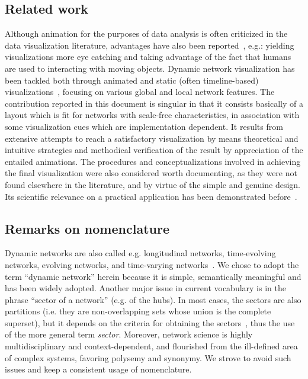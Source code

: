 \documentclass[runningheads]{llncs}
\begin{document}
\subsection{Related work}
Although animation for the purposes of data analysis is often criticized in the data visualization literature, advantages have also been reported~\cite{anim,munzner,cog,ware}, e.g.: yielding visualizations more eye catching and taking advantage of the fact that humans are used to interacting with moving objects.
Dynamic network visualization has been tackled both through animated and static (often timeline-based) visualizations~\cite{hajij,brain,visAn,ego}, focusing on various global and local network features.
The contribution reported in this document is singular in that it consists basically of a layout which is fit for networks with scale-free characteristics, in association with some visualization cues which are implementation dependent. It results from extensive attempts to reach a satisfactory visualization by means theoretical and intuitive strategies and methodical verification of the result by appreciation of the entailed animations.
The procedures and conceptualizations involved in achieving the final visualization were also considered worth documenting, as they were not found elsewhere in the literature, and by virtue of the simple and genuine design. Its scientific relevance on a practical application has been demonstrated before~\cite{stab}.

\subsection{Remarks on nomenclature}
Dynamic networks are also called e.g. longitudinal networks, time-evolving networks, evolving networks, and time-varying networks~\cite{ev,tev,tv,lg}.
We chose to adopt the term ``dynamic network'' herein because it is simple, semantically meaningful and has been widely adopted.
Another major issue in current vocabulary is in the phrase ``sector of a network'' (e.g. of the hubs). In most cases, the sectors are also partitions (i.e. they are non-overlapping sets whose union is the complete superset), but it depends on the criteria for obtaining the sectors~\cite{stab}, thus the use of the more general term \emph{sector}.
Moreover, network science is highly multidisciplinary and context-dependent, and flourished from the ill-defined area of complex systems, favoring polysemy and synonymy. We strove to avoid such issues and keep a consistent usage of nomenclature.
\end{document}
